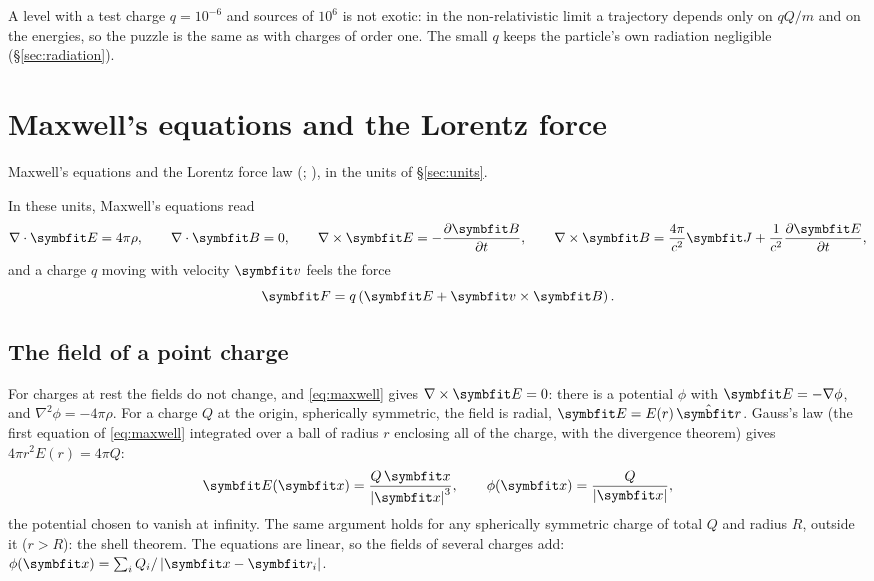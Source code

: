 \documentclass{leveldoc}
\begin{document}
\begin{remark}
A level with a test charge $q = 10^{-6}$ and sources of $10^{6}$ is not exotic: in the
non-relativistic limit a trajectory depends only on $qQ/m$ and on the energies, so the
puzzle is the same as with charges of order one. The small $q$ keeps the particle's own
radiation negligible (§\ref{sec:radiation}).
\end{remark}

\section{Maxwell's equations and the Lorentz force}\label{sec:maxwell}

\begin{principles}
  \item Maxwell's equations and the Lorentz force law (;
    ), in the units of §\ref{sec:units}.
\end{principles}

In these units, Maxwell's equations read
\begin{equation}\label{eq:maxwell}
  \nabla\cdot\vect{E} = 4\pi\rho, \qquad
  \nabla\cdot\vect{B} = 0, \qquad
  \nabla\times\vect{E} = -\pderiv{\vect{B}}{t}, \qquad
  \nabla\times\vect{B} = \frac{4\pi}{c^2}\vect{J} + \frac{1}{c^2}\pderiv{\vect{E}}{t},
\end{equation}
and a charge $q$ moving with velocity $\vect{v}$ feels the force
\begin{equation}\label{eq:lorentz}
  \vect{F} = q\left(\vect{E} + \vect{v}\times\vect{B}\right).
\end{equation}

\subsection{The field of a point charge}\label{sec:coulomb}

For charges at rest the fields do not change, and \eqref{eq:maxwell} gives
$\nabla\times\vect{E} = 0$: there is a potential $\phi$ with $\vect{E} = -\nabla\phi$, and
$\nabla^2\phi = -4\pi\rho$. For a charge $Q$ at the origin, spherically symmetric, the field
is radial, $\vect{E} = E(r)\,\uvec{r}$. Gauss's law (the first equation of
\eqref{eq:maxwell} integrated over a ball of radius $r$ enclosing all of the charge, with the
divergence theorem) gives $4\pi r^2 E(r) = 4\pi Q$:
\begin{equation}\label{eq:coulomb}
  \vect{E}(\vect{x}) = \frac{Q\,\vect{x}}{\abs{\vect{x}}^3}, \qquad
  \phi(\vect{x}) = \frac{Q}{\abs{\vect{x}}},
\end{equation}
the potential chosen to vanish at infinity. The same argument holds for any spherically
symmetric charge of total $Q$ and radius $R$, outside it ($r > R$): the shell theorem. The
equations are linear, so the fields of several charges add:
$\phi(\vect{x}) = \sum_i Q_i/\abs{\vect{x}-\vect{r}_i}$.
\end{document}
